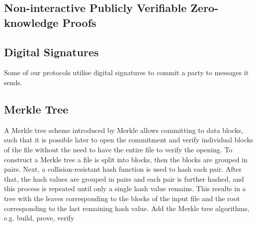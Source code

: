 



\subsection{Non-interactive Publicly Verifiable Zero-knowledge Proofs}

\subsection{Digital Signatures}

Some of our protocols utilise digital signatures to commit a party to messages it sends. 

\subsection{Merkle Tree}

A Merkle tree scheme introduced by Merkle \cite{DBLP:conf/sp/Merkle80,DBLP:conf/crypto/Merkle89} allows   committing to data blocks, such that it is  possible later to open the commitment and verify individual blocks of the file without the need to have the entire file to verify the opening. To construct a Merkle tree a file is split into blocks, then the blocks are grouped in pairs. Next,   a collision-resistant hash function is used to hash each pair. After that, the hash values are grouped in pairs and each pair is further hashed, and this process is repeated until only a single hash value remains. This results in a  tree with the leaves corresponding to the blocks of the input file and the root corresponding to the last remaining hash value.  {\color{blue} Add the Merkle tree algorithms, e.g. build, prove, verify}






